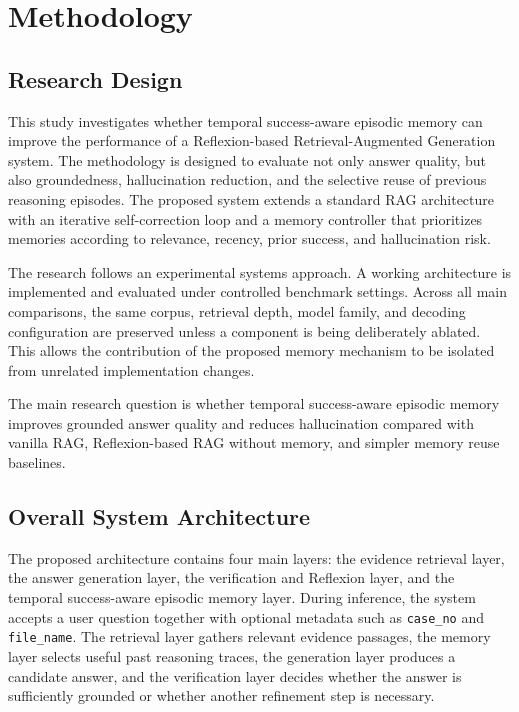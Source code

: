 
\chapter{Methodology}
\label{chap:methodology}

\section{Research Design}
\label{sec:research-design}

This study investigates whether temporal success-aware episodic memory can improve the performance of a Reflexion-based Retrieval-Augmented Generation system. The methodology is designed to evaluate not only answer quality, but also groundedness, hallucination reduction, and the selective reuse of previous reasoning episodes. The proposed system extends a standard RAG architecture with an iterative self-correction loop and a memory controller that prioritizes memories according to relevance, recency, prior success, and hallucination risk.

The research follows an experimental systems approach. A working architecture is implemented and evaluated under controlled benchmark settings. Across all main comparisons, the same corpus, retrieval depth, model family, and decoding configuration are preserved unless a component is being deliberately ablated. This allows the contribution of the proposed memory mechanism to be isolated from unrelated implementation changes.

The main research question is whether temporal success-aware episodic memory improves grounded answer quality and reduces hallucination compared with vanilla RAG, Reflexion-based RAG without memory, and simpler memory reuse baselines.

\section{Overall System Architecture}
\label{sec:overall-system-architecture}

The proposed architecture contains four main layers: the evidence retrieval layer, the answer generation layer, the verification and Reflexion layer, and the temporal success-aware episodic memory layer. During inference, the system accepts a user question together with optional metadata such as \texttt{case\_no} and \texttt{file\_name}. The retrieval layer gathers relevant evidence passages, the memory layer selects useful past reasoning traces, the generation layer produces a candidate answer, and the verification layer decides whether the answer is sufficiently grounded or whether another refinement step is necessary.

